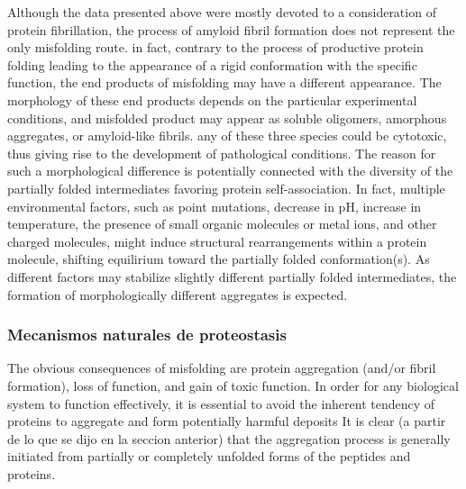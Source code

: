 Although the data presented above were mostly devoted to a consideration of 
protein fibrillation, the process of amyloid fibril formation does not represent 
the only misfolding route. 
in fact, contrary to the process of productive protein 
folding leading to the appearance of a rigid conformation with the specific 
function, the end products of misfolding may have a different appearance. The 
morphology of these end products depends on the particular experimental 
conditions, and misfolded product may appear as soluble oligomers, amorphous aggregates, or amyloid-like fibrils. 
any of these three species could be 
cytotoxic, thus giving rise to the development of pathological conditions. 
The reason for such a morphological difference is potentially connected with the diversity of the partially folded intermediates favoring protein self-association. 
In fact, multiple environmental factors, such as point mutations, decrease in pH, increase in temperature, the presence of small organic molecules or metal ions, and other charged molecules, might induce structural rearrangements within a protein molecule, shifting equilirium toward the partially folded conformation(s). As different factors may stabilize slightly different partially folded intermediates, the formation of morphologically
different aggregates is expected.










































\subsubsection{Mecanismos naturales de proteostasis}

The  obvious  consequences  of  misfolding  are protein  aggregation  (and/or  fibril  formation),  loss  of  function,  and  gain  of  toxic  function.  
In  order  for  any  biological  system  to  function  effectively,  it  is essential to avoid the inherent tendency of proteins to aggregate and form potentially harmful deposits
It  is  clear (a partir de lo que se dijo en la seccion anterior)  that  the aggregation  process  is  generally   initiated  from  partially  or completely  unfolded  forms  of  the  peptides  and  proteins. 


